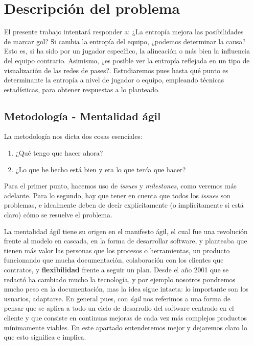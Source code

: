 \chapter{Descripción del problema}
El presente trabajo intentará responder a: ¿La entropía mejora las posibilidades 
de marcar gol? Si cambia la entropía del equipo, ¿podemos determinar la causa? Esto es, 
si ha sido por un jugador específico, la alineación o más bien la influencia del equipo 
contrario. Asimismo, ¿es posible ver la entropía reflejada en un tipo de visualización de 
las redes de pases?. Estudiaremos pues hasta qué punto es determinante la 
entropía a nivel de jugador o equipo, empleando técnicas estadísticas, para obtener respuestas a lo planteado.

\section{Metodología - Mentalidad ágil}
La metodología nos dicta dos cosas esenciales:
\begin{enumerate}
    \item ¿Qué tengo que hacer ahora?
    \item ¿Lo que he hecho está bien y era lo que tenía que hacer?
\end{enumerate}

Para el primer punto, hacemos uso de \textit{issues} y \textit{milestones}, 
como veremos más adelante. Para lo segundo, hay que tener en cuenta que todos 
los \textit{issues} son problemas, e idealmente deben de decir explícitamente 
(o implícitamente si está claro) cómo se resuelve el problema.

La mentalidad ágil tiene su origen en el manifesto ágil\cite{manifesto-agil}, el cual fue una revolución frente 
al modelo en cascada,
en la forma de desarrollar software, y planteaba que tienen más valor las personas que 
los procesos o herramientas, un producto funcionando que mucha documentación, colaboración 
con los clientes que contratos, y \textbf{flexibilidad} frente a seguir un plan. Desde el 
año 2001 que se redactó ha cambiado mucho la tecnología, y por ejemplo nosotros pondremos 
mucho peso en la documentación, mas la idea sigue intacta: lo importante son los usuarios, 
adaptarse. En general pues, con \textit{ágil} nos referimos a una forma de pensar que se aplica 
a todo un ciclo de desarrollo del software centrado en el cliente y que consiste en 
continuas mejoras de cada vez más complejos productos mínimamente viables\cite{agile-science}.
En este apartado entenderemos mejor y dejaremos claro lo que esto significa e implica.

